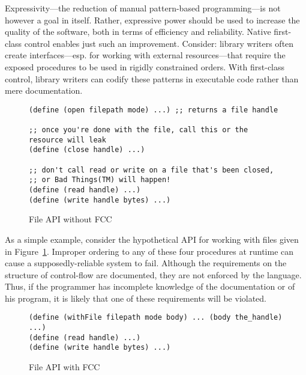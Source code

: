 \documentclass[11pt]{article}
\begin{document}
Expressivity---the reduction of manual pattern-based programming---is not however a goal in itself.
Rather, expressive power should be used to increase the quality of the software, both in terms of efficiency and reliability.
Native first-class control enables just such an improvement.
Consider: library writers often create interfaces---esp. for working with external resources---that require the exposed procedures to be used in rigidly constrained orders.
With first-class control, library writers can codify these patterns in executable code rather than mere documentation.

\begin{figure}
\caption{File API without FCC}
\label{fig:fileAPInoFCC}
\begin{verbatim}
(define (open filepath mode) ...) ;; returns a file handle

;; once you're done with the file, call this or the resource will leak
(define (close handle) ...)

;; don't call read or write on a file that's been closed,
;; or Bad Things(TM) will happen!
(define (read handle) ...)
(define (write handle bytes) ...)
\end{verbatim}
\end{figure}

As a simple example, consider the hypothetical API for working with files given in Figure~\ref{fig:fileAPInoFCC}.
Improper ordering to any of these four procedures at runtime can cause a supposedly-reliable system to fail.
Although the requirements on the structure of control-flow are documented, they are not enforced by the language.
Thus, if the programmer has incomplete knowledge of the documentation or of his program, it is likely that one of these requirements will be violated.

\begin{figure}
\caption{File API with FCC}
\label{fig:fileAPIFCC}
\begin{verbatim}
(define (withFile filepath mode body) ... (body the_handle) ...)
(define (read handle) ...)
(define (write handle bytes) ...)
\end{verbatim}
\end{figure}
\end{document}
